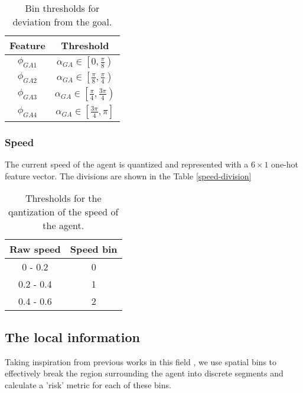 \begin{table}[htbp]
	\caption{Bin thresholds for deviation from the goal.}
	\label{deviation-from-goal-bins}
	\begin{center}
		\renewcommand{\arraystretch}{1.3}
		\begin{tabular}{|c|c|}
			\hline
			Feature & Threshold \\
			\hline
			$\phi_{GA1}$ & $\alpha_{GA} \in \left[ 0 , \frac{\pi}{8} \right)$ \\
			
			$\phi_{GA2}$ & $\alpha_{GA} \in \left[ \frac{\pi}{8} , \frac{\pi}{4} \right)$ \\
			
			$\phi_{GA3}$ & $\alpha_{GA} \in \left[ \frac{\pi}{4} , \frac{3\pi}{4} \right)$ \\
			
			$\phi_{GA4}$ & $\alpha_{GA} \in \left[ \frac{3\pi}{4} , \pi \right]$ \\
			\hline
		\end{tabular}
	\end{center}
\end{table}

\subsubsection*{Speed}
The current speed of the agent is quantized and represented with a $ 6 \times 1$ one-hot feature vector. 
The divisions are shown in the Table \ref{speed-division}

\begin{table}[htbp]
	\caption{Thresholds for the qantization of the speed of the agent.}
	\label{deviation-from-goal-bins}
	\begin{center}
		\renewcommand{\arraystretch}{1.3}
		\begin{tabular}{|c|c|}
			\hline
			Raw speed & Speed bin \\
			\hline
			0 - 0.2 & 0 \\
			0.2 - 0.4 & 1 \\
			0.4 - 0.6 & 2 \\
			\hline
		\end{tabular}
	\end{center}
	\end{table}

\subsection*{The local information}
Taking inspiration from previous works in this field \cite{fahad-et-al} \cite{vasquez-et-al}, we use spatial bins to effectively break the region surrounding the agent into discrete segments and calculate a 'risk' metric for each of these bins.

